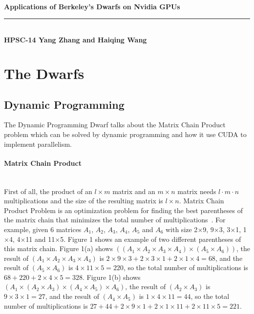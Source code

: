 \documentclass[11pt]{article}
\begin{document}

\noindent
\begin{minipage}{1.0\linewidth}
  {\Large \bf  
    Applications of Berkeley's Dwarfs on Nvidia GPUs
  }\\[-1.5mm]
  \noindent\rule{\linewidth}{1pt}\\[-2pt] 
  {\small \bf HPSC-14 \hfill
    Yang Zhang and Haiqing Wang
  }
\end{minipage}

\section{The Dwarfs}
	\subsection{Dynamic Programming}

The Dynamic Programming Dwarf talks about the Matrix Chain Product problem which can be solved by dynamic programming and how it use CUDA to implement parallelism.

		\paragraph{Matrix Chain Product}
\hfill \\ 

First of all, the product of an $l \times m$ matrix and an $m \times n$ matrix needs $l\cdot m\cdot n$ multiplications and the size of the resulting matrix is $l \times n$. Matrix Chain Product Problem is an optimization problem for finding the best parentheses of the matrix chain that minimizes the total number of multiplications~\cite{DP}. For example, given 6 matrices $A_1$, $A_2$, $A_3$, $A_4$, $A_5$ and $A_6$ with size 2$\times $9, 9$\times $3, 3$\times $1, 1$\times $4, 4$\times $11 and 11$\times $5. Figure 1 shows an example of two different parentheses of this matrix chain. Figure 1(a) shows $((A_1\times  A_2\times  A_3\times  A_4)\times  (A_5\times  A_6))$, the result of $(A_1\times  A_2\times  A_3\times  A_4)$ is $2\times 9\times 3+2\times 3\times 1+2\times 1\times 4=68$, and the result of  $(A_5\times  A_6)$ is $4\times 11\times 5=220$, so the total number of multiplications is $68+220+2\times 4\times 5=328$. Figure 1(b) shows $(A_1\times  (A_2\times  A_3)\times  (A_4\times  A_5)\times  A_6)$, the result of $(A_2\times  A_3)$ is $9\times 3\times 1=27$, and the result of $(A_4\times  A_5)$ is $1\times 4\times 11=44$, so the total number of multiplications is $27+44+2\times 9\times 1+2\times 1\times 11+2\times 11\times 5=221$. \\
		
\end{document}
